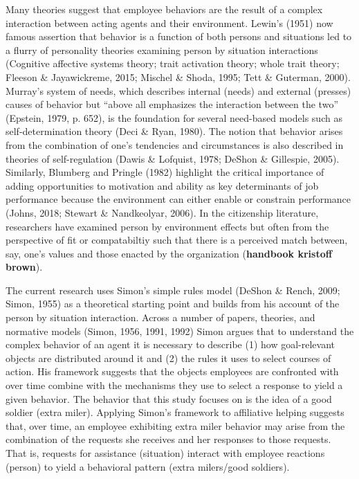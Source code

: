 \documentclass[english,,man]{apa6}
\begin{document}
Many theories suggest that employee behaviors are the result of a complex interaction between acting agents and their environment. Lewin's (1951) now famous assertion that behavior is a function of both persons and situations led to a flurry of personality theories examining person by situation interactions (Cognitive affective systems theory; trait activation theory; whole trait theory; Fleeson \& Jayawickreme, 2015; Mischel \& Shoda, 1995; Tett \& Guterman, 2000). Murray's system of needs, which describes internal (needs) and external (presses) causes of behavior but \enquote{above all emphasizes the interaction between the two} (Epstein, 1979, p. 652), is the foundation for several need-based models such as self-determination theory (Deci \& Ryan, 1980). The notion that behavior arises from the combination of one's tendencies and circumstances is also described in theories of self-regulation (Dawis \& Lofquist, 1978; DeShon \& Gillespie, 2005). Similarly, Blumberg and Pringle (1982) highlight the critical importance of adding opportunities to motivation and ability as key determinants of job performance because the environment can either enable or constrain performance (Johns, 2018; Stewart \& Nandkeolyar, 2006). In the citizenship literature, researchers have examined person by environment effects but often from the perspective of fit or compatabiltiy such that there is a perceived match between, say, one's values and those enacted by the organization (\textbf{handbook kristoff brown}).

The current research uses Simon's simple rules model (DeShon \& Rench, 2009; Simon, 1955) as a theoretical starting point and builds from his account of the person by situation interaction. Across a number of papers, theories, and normative models (Simon, 1956, 1991, 1992) Simon argues that to understand the complex behavior of an agent it is necessary to describe (1) how goal-relevant objects are distributed around it and (2) the rules it uses to select courses of action. His framework suggests that the objects employees are confronted with over time combine with the mechanisms they use to select a response to yield a given behavior. The behavior that this study focuses on is the idea of a good soldier (extra miler). Applying Simon's framework to affiliative helping suggests that, over time, an employee exhibiting extra miler behavior may arise from the combination of the requests she receives and her responses to those requests. That is, requests for assistance (situation) interact with employee reactions (person) to yield a behavioral pattern (extra milers/good soldiers).
\end{document}
